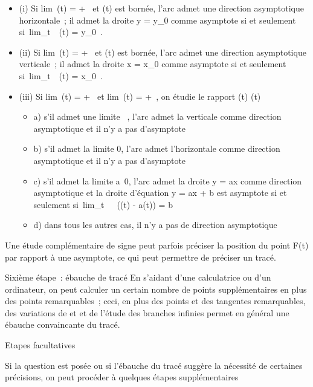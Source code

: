 \documentclass[]{article}
\begin{document}
\begin{itemize}
\itemsep1pt\parskip0pt
\item
  (i) Si lim~\textbar{}\phi(t)\textbar{} = +\infty~ et
  \psi(t) est bornée, l'arc admet une direction asymptotique horizontale~;
  il admet la droite y = y\_0 comme asymptote si et seulement
  si~lim\_t\rightarrow~\alpha~\psi(t) = y\_0~.
\item
  (ii) Si lim~\textbar{}\psi(t)\textbar{} = +\infty~ et
  \phi(t) est bornée, l'arc admet une direction asymptotique verticale~; il
  admet la droite x = x\_0 comme asymptote si et seulement
  si~lim\_t\rightarrow~\alpha~\phi(t) = x\_0~.
\item
  (iii) Si lim~\textbar{}\phi(t)\textbar{} = +\infty~ et
  lim~\textbar{}\psi(t)\textbar{} = +\infty~, on étudie
  le rapport  \psi(t) \over \phi(t)

  \begin{itemize}
  \itemsep1pt\parskip0pt
  \item
    a) s'il admet une limite \infty~, l'arc admet la verticale comme direction
    asymptotique et il n'y a pas d'asymptote
  \item
    b) s'il admet la limite 0, l'arc admet l'horizontale comme direction
    asymptotique et il n'y a pas d'asymptote
  \item
    c) s'il admet la limite a\neq~0, l'arc admet
    la droite y = ax comme direction asymptotique et la droite
    d'équation y = ax + b est asymptote si et seulement
    si~lim\_t\rightarrow~\alpha~~(\psi(t) - a\phi(t)) = b
  \item
    d) dans tous les autres cas, il n'y a pas de direction asymptotique
  \end{itemize}
\end{itemize}

Une étude complémentaire de signe peut parfois préciser la position du
point F(t) par rapport à une asymptote, ce qui peut permettre de
préciser un tracé.

Sixième étape~: ébauche de tracé En s'aidant d'une calculatrice ou d'un
ordinateur, on peut calculer un certain nombre de points supplémentaires
en plus des points remarquables~; ceci, en plus des points et des
tangentes remarquables, des variations de \phi et \psi et de l'étude des
branches infinies permet en général une ébauche convaincante du tracé.

Etapes facultatives

Si la question est posée ou si l'ébauche du tracé suggère la nécessité
de certaines précisions, on peut procéder à quelques étapes
supplémentaires
\end{document}
